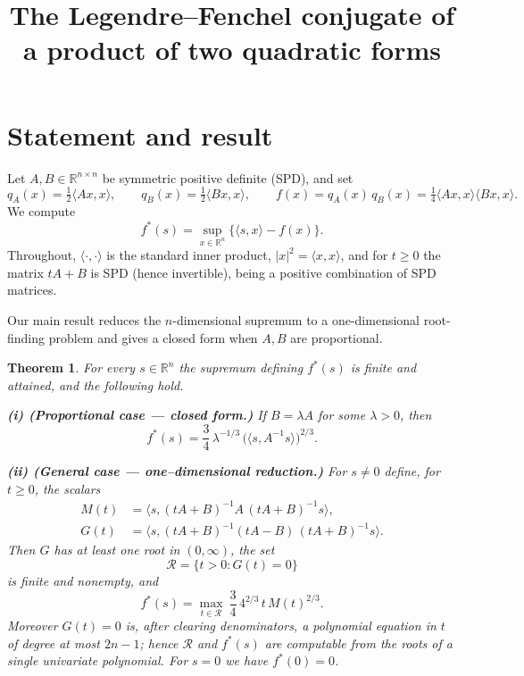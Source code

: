 \documentclass{amsart}
\newtheorem{theorem}{Theorem}
\theoremstyle{definition}
\begin{document}
\title{The Legendre--Fenchel conjugate of a product of two quadratic forms}
\maketitle

\section{Statement and result}

Let $A,B\in\mathbb{R}^{n\times n}$ be symmetric positive definite (SPD), and set
\[
q_A(x)=\tfrac12\langle Ax,x\rangle,\qquad q_B(x)=\tfrac12\langle Bx,x\rangle,
\qquad
f(x)=q_A(x)\,q_B(x)=\tfrac14\langle Ax,x\rangle\langle Bx,x\rangle .
\]
We compute
\[
f^*(s)=\sup_{x\in\mathbb{R}^n}\bigl\{\langle s,x\rangle-f(x)\bigr\}.
\]
Throughout, $\langle\cdot,\cdot\rangle$ is the standard inner product, $|x|^2=\langle x,x\rangle$, and for $t\ge 0$ the matrix $tA+B$ is SPD (hence invertible), being a positive combination of SPD matrices.

Our main result reduces the $n$-dimensional supremum to a one-dimensional root-finding problem and gives a closed form when $A,B$ are proportional.

\begin{theorem}\label{thm:main}
For every $s\in\mathbb{R}^n$ the supremum defining $f^*(s)$ is finite and attained, and the following hold.

\medskip
\noindent\textbf{(i) (Proportional case --- closed form.)}
If $B=\lambda A$ for some $\lambda>0$, then
\begin{equation}\label{eq:prop}
f^*(s)=\frac{3}{4}\,\lambda^{-1/3}\,\bigl(\langle s,A^{-1}s\rangle\bigr)^{2/3}.
\end{equation}

\medskip
\noindent\textbf{(ii) (General case --- one--dimensional reduction.)}
For $s\ne 0$ define, for $t\ge 0$, the scalars
\begin{align}
M(t)&=\bigl\langle s,(tA+B)^{-1}A\,(tA+B)^{-1}s\bigr\rangle,\label{eq:Mdef}\\
G(t)&=\bigl\langle s,(tA+B)^{-1}(tA-B)\,(tA+B)^{-1}s\bigr\rangle.\label{eq:Gdef}
\end{align}
Then $G$ has at least one root in $(0,\infty)$, the set
\[
\mathcal{R}=\{t>0: G(t)=0\}
\]
is finite and nonempty, and
\begin{equation}\label{eq:general}
f^*(s)=\max_{t\in\mathcal R}\ \frac{3}{4}\,4^{2/3}\,t\,M(t)^{2/3}.
\end{equation}
Moreover $G(t)=0$ is, after clearing denominators, a polynomial equation in $t$ of degree at most $2n-1$; hence $\mathcal R$ and $f^*(s)$ are computable from the roots of a single univariate polynomial. For $s=0$ we have $f^*(0)=0$.
\end{theorem}
\end{document}
